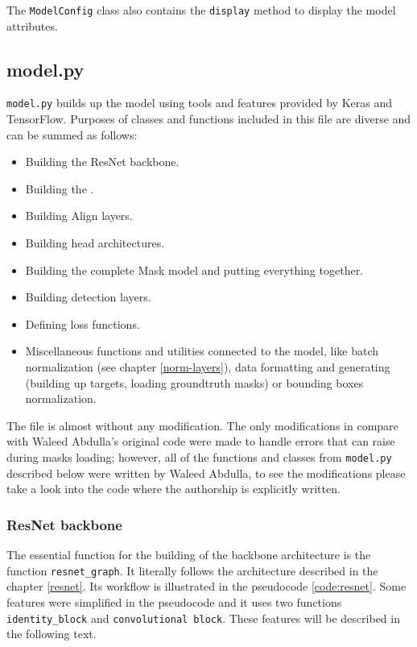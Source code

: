 The \verb|ModelConfig| class also contains the \verb|display| method to display the model attributes.

\subsection{model.py}
\label{model}

\verb|model.py| builds up the model using tools and features provided by Keras and TensorFlow. Purposes of classes and functions included in this file are diverse and can be summed as follows:
\begin{itemize}
	\item Building the ResNet backbone.
	\item Building the .
	\item Building Align layers.
	\item Building head architectures.
	\item Building the complete Mask  model and putting everything together.
	\item Building detection layers.
	\item Defining loss functions.
	\item Miscellaneous functions and utilities connected to the model, like batch normalization (see chapter \ref{norm-layers}), data formatting and generating (building up targets, loading groundtruth masks) or bounding boxes normalization.
\end{itemize}

The file is almost without any modification. The only modifications in compare with Waleed Abdulla's original code were made to handle errors that can raise during masks loading; however, all of the functions and classes from \verb|model.py| described below were written by Waleed Abdulla, to see the modifications please take a look into the code where the authorship is explicitly written.

\subsubsection{ResNet backbone}
\label{model-resnet}

The essential function for the building of the backbone architecture is the function \verb|resnet_graph|. It literally follows the architecture described in the chapter \ref{resnet}. Its workflow is illustrated in the pseudocode \ref{code:resnet}. Some features were simplified in the pseudocode and it uses two functions \verb|identity_block| and \verb|convolutional block|. These features will be described in the following text.

